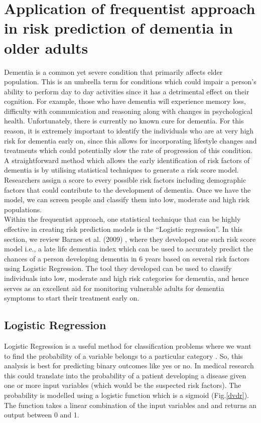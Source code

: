 \documentclass[12pt,letterpaper]{article}
\begin{document}
\section{Application of frequentist approach in risk prediction of dementia in older adults}
Dementia \cite{dem} is a common yet severe condition that primarily affects elder population. This is an umbrella term for conditions which could impair a person's ability to perform day to day activities since it has a detrimental effect on their cognition. For example, those who have dementia will experience memory loss, difficulty with communication and reasoning along with changes in psychological health. Unfortunately, there is currently no known cure for dementia. For this reason, it is extremely important to identify the individuals who are at very high risk for dementia early on, since this allows for incorporating lifestyle changes and treatments which could potentially slow the rate of progression of this condition. A straightforward method which allows the early identification of risk factors of dementia is by utilising statistical techniques to generate a risk score model. Researchers assign a score to every possible risk factors including demographic factors that could contribute to the development of dementia. Once we have the model, we can screen people and classify them into low, moderate and high risk populations.\\

Within the frequentist approach, one statistical technique that can be highly effective in creating risk prediction models is the ``Logistic regression''. In this section, we review Barnes et al. (2009) \cite{barnes2009}, where they developed one such risk score model i.e., a late life dementia index which can be used to accurately predict the chances of a person developing dementia in 6 years based on several risk factors using Logistic Regression. The tool they developed can be used to classify individuals into low, moderate and high risk categories for dementia, and hence serves as an excellent aid for monitoring vulnerable adults for dementia symptoms to start their treatment early on.  

\subsection{Logistic Regression}

Logistic Regression is a useful method for classification problems where we want to find the probability of a variable belongs to a particular category \cite{intro2013}. So, this analysis is best for predicting binary outcomes like yes or no. In medical research this could translate into the probability of a patient developing a disease given one or more input variables (which would be the suspected risk factors). The probability is modelled using a logistic function which is a sigmoid (Fig.\ref{dvdr}). The function takes a linear combination of the input variables and  and returns an output between 0 and 1. \\
\end{document}

